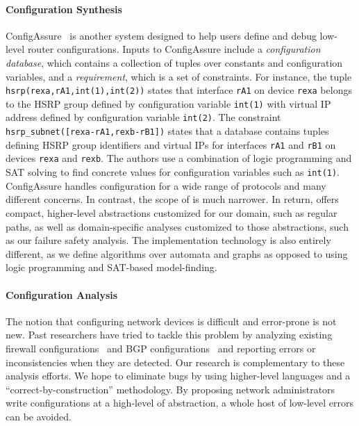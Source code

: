 \paragraph*{Configuration Synthesis}
ConfigAssure~\cite{narain:lisa05,narain+:configassure}
is another system designed to
help users define and debug low-level router
configurations.  Inputs to
ConfigAssure include a \emph{configuration database}, which contains a
collection of tuples over constants and configuration variables, and a
\emph{requirement}, which is a set of constraints.  For instance, the
tuple \texttt{hsrp(rexa,rA1,int(1),int(2))} states that interface
\texttt{rA1} on device \texttt{rexa} belongs to the HSRP group defined
by configuration variable \texttt{int(1)} with virtual IP address
defined by configuration variable \texttt{int(2)}.  The constraint
\texttt{hsrp\_subnet([rexa-rA1,rexb-rB1])} states that a database
contains tuples defining HSRP group identifiers and virtual IPs for
interfaces \texttt{rA1} and \texttt{rB1} on devices \texttt{rexa} and
\texttt{rexb}.  The authors use a combination of logic programming and
SAT solving to find concrete values for configuration variables such
as \texttt{int(1)}.  ConfigAssure handles
configuration for a wide range of protocols and many
different concerns.  In contrast, the scope of \sysname is much
narrower.  In return, \sysname offers compact, higher-level
abstractions customized for our domain, such as regular paths, as well
as domain-specific analyses customized to those abstractions, such as
our failure safety analysis.  The implementation technology is also
entirely different, as we define algorithms over automata and graphs
as opposed to using logic programming and SAT-based model-finding.

\paragraph*{Configuration Analysis}  The notion that
configuring network devices is difficult and error-prone is not new.  Past
researchers have
tried to tackle this problem by analyzing existing
firewall configurations~\cite{fang,lumeta,margrave} and
BGP configurations~\cite{feamster+:rcc,feamster:thesis,ipassure,batfish,bagpipe} and reporting errors or
inconsistencies when they are detected.
Our research is complementary to these analysis
efforts.  We hope to eliminate bugs by using higher-level
languages and a ``correct-by-construction''
methodology.  By proposing network administrators write configurations
at a high-level of abstraction, a whole host of low-level errors can be
avoided.  



